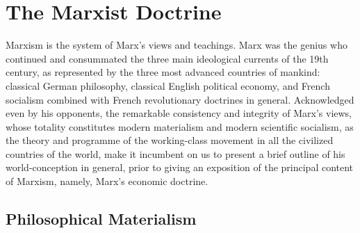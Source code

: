 \documentclass[a4paper,12pt]{book}
\begin{document}
\chapter{The Marxist Doctrine}
Marxism is the system of Marx’s views and teachings. Marx was the genius who continued and consummated the three main ideological currents of the 19th century, as represented by the three most advanced countries of mankind: classical German philosophy, classical English political economy, and French socialism combined with French revolutionary doctrines in general. Acknowledged even by his opponents, the remarkable consistency and integrity of Marx’s views, whose totality constitutes modern materialism and modern scientific socialism, as the theory and programme of the working-class movement in all the civilized countries of the world, make it incumbent on us to present a brief outline of his world-conception in general, prior to giving an exposition of the principal content of Marxism, namely, Marx’s economic doctrine.

\section*{Philosophical Materialism}
\end{document}

